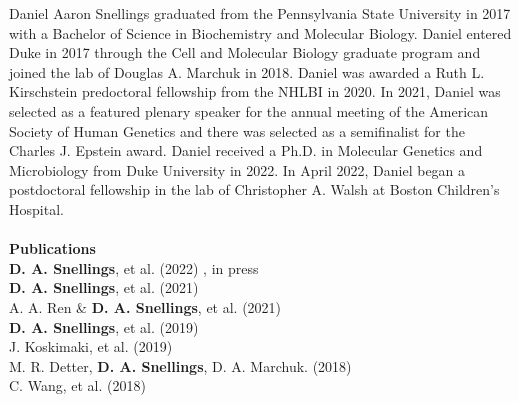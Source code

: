 \biography

Daniel Aaron Snellings graduated from the Pennsylvania State University in 2017 with a Bachelor of Science in Biochemistry and Molecular Biology. Daniel entered Duke in 2017 through the Cell and Molecular Biology graduate program and joined the lab of Douglas A. Marchuk in 2018. Daniel was awarded a Ruth L. Kirschstein predoctoral fellowship from the NHLBI in 2020. In 2021, Daniel was selected as a featured plenary speaker for the annual meeting of the American Society of Human Genetics and there was selected as a semifinalist for the Charles J. Epstein award. Daniel received a Ph.D. in Molecular Genetics and Microbiology from Duke University in 2022. In April 2022, Daniel began a postdoctoral fellowship in the lab of Christopher A. Walsh at Boston Children's Hospital.
\\\\
{\Large \textbf{Publications}} \\
\textbf{D. A. Snellings}, et al. (2022) , in press\\
\textbf{D. A. Snellings}, et al. (2021) \\ \nocite{snellings2021}
A. A. Ren \& \textbf{D. A. Snellings}, et al. (2021) \\ \nocite{ren2021}
\textbf{D. A. Snellings}, et al. (2019) \\ \nocite{snellings2019}
J. Koskimaki, et al. (2019) \\ \nocite{koskimaki2019}
M. R. Detter, \textbf{D. A. Snellings}, D. A. Marchuk. (2018) \\ \nocite{detter2018}
C. Wang, et al. (2018)  \nocite{wang2018}